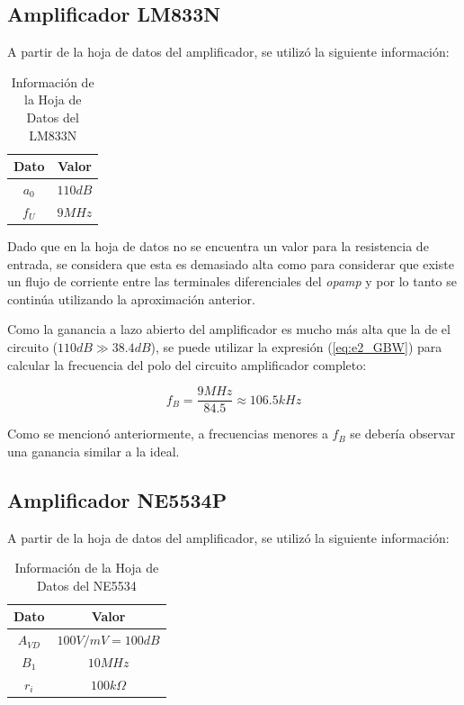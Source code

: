 \subsection{Amplificador LM833N}
A partir de la hoja de datos del amplificador, se utilizó la siguiente información:
 
\begin{table}[ht]
\begin{center}
\begin{tabular}{||c|c||}
\hline
	Dato	&	Valor		\\
	\hline
	$a_0$	&	$110 dB$	\\
	$f_U$	&	$9 MHz$		\\
\hline
\end{tabular}
\end{center}
\caption{Información de la Hoja de Datos del LM833N}
\label{tab:e2_info_lm}
\end{table}

Dado que en la hoja de datos no se encuentra un valor para la resistencia de entrada, se considera que esta es demasiado alta como para considerar que existe un flujo de corriente entre las terminales diferenciales del \textit{opamp} y por lo tanto se continúa utilizando la aproximación anterior.

Como la ganancia a lazo abierto del amplificador es mucho más alta que la de el circuito ($110 dB \gg 38.4 dB$), se puede utilizar la expresión (\ref{eq:e2_GBW}) para calcular la frecuencia del polo del circuito amplificador completo:

\begin{equation}
f_B= \frac{9 MHz}{84.5} \approx 106.5 kHz
\label{val:e2_fB_lm}
\end{equation}

Como se mencionó anteriormente, a frecuencias menores a $f_B$ se debería observar una ganancia similar a la ideal.

\subsection{Amplificador NE5534P}
A partir de la hoja de datos del amplificador, se utilizó la siguiente información:

\begin{table}[ht]
\begin{center}
\begin{tabular}{||c|c||}
\hline
	Dato	&	Valor		\\
	\hline
	$A_{VD}$	&	$100 V/mV = 100 dB$	\\
	$B_1$	&	$10 MHz$		\\
	$r_i$	&	$100 k\Omega$	\\
\hline
\end{tabular}
\end{center}
\caption{Información de la Hoja de Datos del NE5534}
\label{tab:e2_info_ne}
\end{table}

